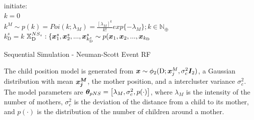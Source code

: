 \begin{algorithm}[H]
\SetAlgoLined
initiate:\\
$k = 0$\\
$k^M \sim p(k) = Poi(k;\lambda_M) = \frac{[\lambda_M]^k}{k!}exp\{-\lambda_M\};k\in\mathbb{N}_\oplus$\\
$k_\textrm{D}^s = k$\;
$\mathbb{X}_\textrm{D}^{NS_s}:\{\bm{x}_1^s,\bm{x}_2^s,...,\bm{x}_{k_\textrm{D}^s}^s \sim p(\bm{x}_1,\bm{x}_2,...,\bm{x}_{k_\textrm{D}}$\;
 \caption{Sequential Simulation - Neuman-Scott Event RF}
 \label{alg:SSNS}
\end{algorithm}

The child position model is generated from $\bm{x} \sim \phi_2(\textrm{D};\bm{x}_j^M, \sigma_c^2\bm{I}_2)$, a Gaussian distribution with mean $\bm{x_j^M}$, the mother position, and a intercluster variance $\sigma_c^2$. The model parameters are $\bm{\theta}_{pNS} = \left[\lambda_M,\sigma_c^2,p(\cdot)\right]$, where $\lambda_M$ is the intensity of the number of mothers, $\sigma_c^2$ is the deviation of the distance from a child to its mother, and $p(\cdot)$ is the distribution of the number of children around a mother.

